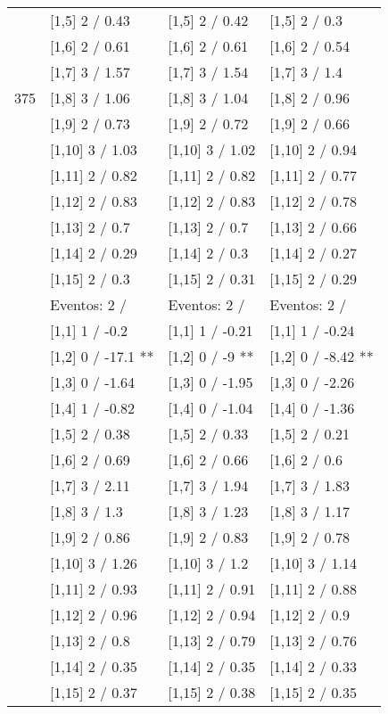\begin{table}
\begin{tabular}[t]{llll}
 & {}[1,5] 2  / 0.43 & {}[1,5] 2  / 0.42 & {}[1,5] 2  / 0.3\\
 & {}[1,6] 2  / 0.61 & {}[1,6] 2  / 0.61 & {}[1,6] 2  / 0.54\\
 & {}[1,7] 3  / 1.57 & {}[1,7] 3  / 1.54 & {}[1,7] 3  / 1.4\\
375 & {}[1,8] 3  / 1.06 & {}[1,8] 3  / 1.04 & {}[1,8] 2  / 0.96\\
\addlinespace
 & {}[1,9] 2  / 0.73 & {}[1,9] 2  / 0.72 & {}[1,9] 2  / 0.66\\
 & {}[1,10] 3  / 1.03 & {}[1,10] 3  / 1.02 & {}[1,10] 2  / 0.94\\
 & {}[1,11] 2  / 0.82 & {}[1,11] 2  / 0.82 & {}[1,11] 2  / 0.77\\
 & {}[1,12] 2  / 0.83 & {}[1,12] 2  / 0.83 & {}[1,12] 2  / 0.78\\
 & {}[1,13] 2  / 0.7 & {}[1,13] 2  / 0.7 & {}[1,13] 2  / 0.66\\
\addlinespace
 & {}[1,14] 2  / 0.29 & {}[1,14] 2  / 0.3 & {}[1,14] 2  / 0.27\\
 & {}[1,15] 2  / 0.3 & {}[1,15] 2  / 0.31 & {}[1,15] 2  / 0.29\\
 & Eventos:  2 / & Eventos:  2 / & Eventos:  2 /\\
 & {}[1,1] 1  / -0.2 & {}[1,1] 1  / -0.21 & {}[1,1] 1  / -0.24\\
 & {}[1,2] 0  / -17.1 ** & {}[1,2] 0  / -9 ** & {}[1,2] 0  / -8.42 **\\
\addlinespace
 & {}[1,3] 0  / -1.64 & {}[1,3] 0  / -1.95 & {}[1,3] 0  / -2.26\\
 & {}[1,4] 1  / -0.82 & {}[1,4] 0  / -1.04 & {}[1,4] 0  / -1.36\\
 & {}[1,5] 2  / 0.38 & {}[1,5] 2  / 0.33 & {}[1,5] 2  / 0.21\\
 & {}[1,6] 2  / 0.69 & {}[1,6] 2  / 0.66 & {}[1,6] 2  / 0.6\\
 & {}[1,7] 3  / 2.11 & {}[1,7] 3  / 1.94 & {}[1,7] 3  / 1.83\\
\addlinespace
500 & {}[1,8] 3  / 1.3 & {}[1,8] 3  / 1.23 & {}[1,8] 3  / 1.17\\
 & {}[1,9] 2  / 0.86 & {}[1,9] 2  / 0.83 & {}[1,9] 2  / 0.78\\
 & {}[1,10] 3  / 1.26 & {}[1,10] 3  / 1.2 & {}[1,10] 3  / 1.14\\
 & {}[1,11] 2  / 0.93 & {}[1,11] 2  / 0.91 & {}[1,11] 2  / 0.88\\
 & {}[1,12] 2  / 0.96 & {}[1,12] 2  / 0.94 & {}[1,12] 2  / 0.9\\
\addlinespace
 & {}[1,13] 2  / 0.8 & {}[1,13] 2  / 0.79 & {}[1,13] 2  / 0.76\\
 & {}[1,14] 2  / 0.35 & {}[1,14] 2  / 0.35 & {}[1,14] 2  / 0.33\\
 & {}[1,15] 2  / 0.37 & {}[1,15] 2  / 0.38 & {}[1,15] 2  / 0.35\\
\bottomrule
\end{tabular}
\end{table}
